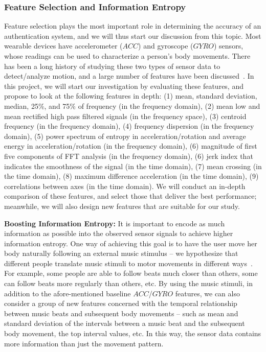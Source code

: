\subsubsection{Feature Selection and Information Entropy}\label{sec:feature}
Feature selection plays the most important role in determining the accuracy of an authentication system, and we will thus start our discussion from this topic.  Most wearable devices have accelerometer ($ACC$) and gyroscope ($GYRO$) sensors, whose readings can be used to characterize a person's body movements. There has been a long history of studying these two types of sensor data to detect/analyze motion, and a large number of features have been discussed~\cite{palmerini2011feature,Pirttikangas2006feature,preece2009comparison,bao2004activity,zhang2011feature}. In this project, we will start our investigation by evaluating these features, and propose to look at the following features in depth: (1) mean, standard deviation, median, 25\%, and 75\% of frequency (in the frequency domain), (2) mean low and mean rectified high pass filtered signals (in the frequency space), (3) centroid frequency (in the frequency domain), (4) frequency dispersion (in the frequency domain), (5) power spectrum of entropy in acceleration/rotation and average energy in acceleration/rotation (in the frequency domain), (6) magnitude of first five components of FFT analysis (in the frequency domain), (6) jerk index that indicates the smoothness of the signal (in the time domain), (7) mean crossing (in the time domain), (8) maximum difference acceleration (in the time domain), (9) correlations between axes (in the time domain). We will conduct an in-depth comparison of these features, and select those that deliver the best performance; meanwhile, we will also design new features that are suitable for our study.

\vspace{4pt}\textbf{Boosting Information Entropy:} It is important to encode as much information as possible into the observed sensor signals to achieve higher information entropy. One way of achieving this goal is to have the user move her body naturally following an external music stimulus -- we hypothesize that different people translate music stimuli to motor movements in different ways~\cite{bartenieff1980body,brass2001movement,dassonville2001effect}. For example, some people are able to follow beats much closer than others, some can follow beats more regularly than others, etc. By using the music stimuli, in addition to the afore-mentioned baseline $ACC$/$GYRO$ features, we can also consider a group of new features concerned with the temporal relationship between music beats and subsequent body movements --  such as mean and standard deviation of the intervals between a music beat and the subsequent body movement, the top interval values, etc. In this way, the sensor data contains more information than just the movement pattern.

